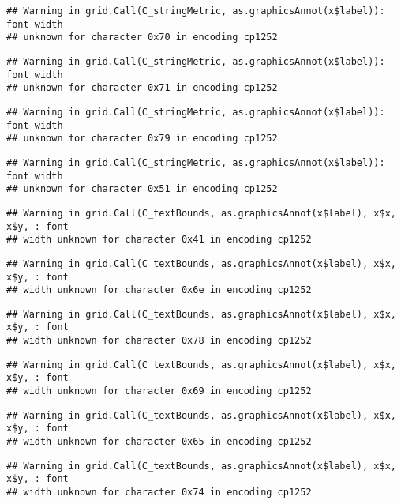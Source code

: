 \documentclass[
]{article}
\begin{document}
\begin{verbatim}
## Warning in grid.Call(C_stringMetric, as.graphicsAnnot(x$label)): font width
## unknown for character 0x70 in encoding cp1252
\end{verbatim}

\begin{verbatim}
## Warning in grid.Call(C_stringMetric, as.graphicsAnnot(x$label)): font width
## unknown for character 0x71 in encoding cp1252
\end{verbatim}

\begin{verbatim}
## Warning in grid.Call(C_stringMetric, as.graphicsAnnot(x$label)): font width
## unknown for character 0x79 in encoding cp1252
\end{verbatim}

\begin{verbatim}
## Warning in grid.Call(C_stringMetric, as.graphicsAnnot(x$label)): font width
## unknown for character 0x51 in encoding cp1252
\end{verbatim}

\begin{verbatim}
## Warning in grid.Call(C_textBounds, as.graphicsAnnot(x$label), x$x, x$y, : font
## width unknown for character 0x41 in encoding cp1252
\end{verbatim}

\begin{verbatim}
## Warning in grid.Call(C_textBounds, as.graphicsAnnot(x$label), x$x, x$y, : font
## width unknown for character 0x6e in encoding cp1252
\end{verbatim}

\begin{verbatim}
## Warning in grid.Call(C_textBounds, as.graphicsAnnot(x$label), x$x, x$y, : font
## width unknown for character 0x78 in encoding cp1252
\end{verbatim}

\begin{verbatim}
## Warning in grid.Call(C_textBounds, as.graphicsAnnot(x$label), x$x, x$y, : font
## width unknown for character 0x69 in encoding cp1252
\end{verbatim}

\begin{verbatim}
## Warning in grid.Call(C_textBounds, as.graphicsAnnot(x$label), x$x, x$y, : font
## width unknown for character 0x65 in encoding cp1252
\end{verbatim}

\begin{verbatim}
## Warning in grid.Call(C_textBounds, as.graphicsAnnot(x$label), x$x, x$y, : font
## width unknown for character 0x74 in encoding cp1252
\end{verbatim}
\end{document}
